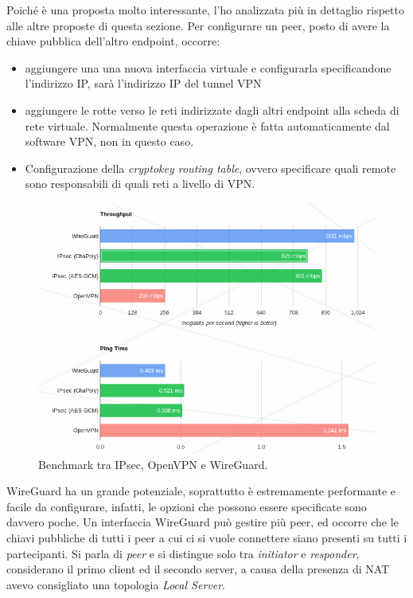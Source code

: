 Poiché è una proposta molto interessante, l'ho analizzata più in dettaglio rispetto
alle altre proposte di questa sezione. Per configurare un peer,
posto di avere la chiave pubblica dell'altro endpoint, occorre:
\begin{itemize}
  \item aggiungere una una nuova interfaccia virtuale e configurarla specificandone
  l'indirizzo IP, sarà l'indirizzo IP del tunnel VPN
  \item aggiungere le rotte verso le reti indirizzate dagli altri endpoint alla scheda
  di rete virtuale. Normalmente questa operazione è fatta automaticamente dal software
  VPN, non in questo caso.
  \item Configurazione della \textit{cryptokey routing table}, ovvero specificare
  quali remote sono responsabili di quali reti a livello di VPN.
\end{itemize}
\begin{figure}
  \includegraphics[scale=0.45]{img/wireguard_performance}
  \caption[Benchmark tra IPsec, OpenVPN e WireGuard]{Benchmark tra IPsec, OpenVPN e WireGuard.}
  \label{fig:wireguard-performance}
\end{figure}
WireGuard ha un grande potenziale, soprattutto è estremamente performante e facile
da configurare, infatti, le opzioni che possono essere specificate sono davvero poche.
Un interfaccia WireGuard può gestire più peer, ed occorre che le chiavi pubbliche di tutti
i peer a cui ci si vuole connettere siano presenti su tutti i partecipanti. Si parla
di \textit{peer} e si distingue solo tra \textit{initiator} e \textit{responder},
considerano il primo client ed il secondo server, a causa della presenza di NAT
avevo consigliato una topologia \textit{Local Server}.



